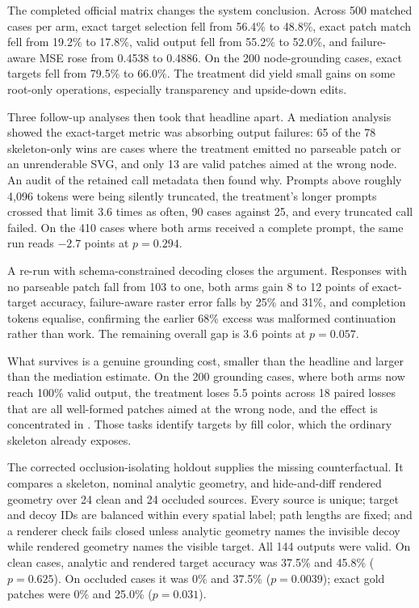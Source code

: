 \documentclass[10pt,a4paper]{article}
\newcommand{\code}[1]{\texttt{\detokenize{#1}}}
\begin{document}
The completed official matrix changes the system conclusion. Across 500
matched cases per arm, exact target selection fell from 56.4\% to 48.8\%,
exact patch match fell from 19.2\% to 17.8\%, valid output fell from 55.2\% to
52.0\%, and failure-aware MSE rose from 0.4538 to 0.4886. On the 200
node-grounding cases, exact targets fell from 79.5\% to 66.0\%. The treatment
did yield small gains on some root-only operations, especially transparency and
upside-down edits.

Three follow-up analyses then took that headline apart. A mediation analysis
showed the exact-target metric was absorbing output failures: 65 of the 78
skeleton-only wins are cases where the treatment emitted no parseable patch or
an unrenderable SVG, and only 13 are valid patches aimed at the wrong node. An
audit of the retained call metadata then found why. Prompts above roughly
4,096 tokens were being silently truncated, the treatment's longer prompts
crossed that limit 3.6 times as often, 90 cases against 25, and every
truncated call failed. On the 410 cases where both arms received a complete
prompt, the same run reads \(-2.7\) points at \(p=0.294\).

A re-run with schema-constrained decoding closes the argument. Responses with
no parseable patch fall from 103 to one, both arms gain 8 to 12 points of
exact-target accuracy, failure-aware raster error falls by 25\% and 31\%,
and completion tokens equalise, confirming the earlier 68\% excess was
malformed continuation rather than work. The remaining overall gap is 3.6
points at \(p=0.057\).

What survives is a genuine grounding cost, smaller than the headline and
larger than the mediation estimate. On the 200 grounding cases, where both
arms now reach 100\% valid output, the treatment loses 5.5 points across 18
paired losses that are all well-formed patches aimed at the wrong node, and
the effect is concentrated in \code{change_color}. Those tasks identify
targets by fill color, which the ordinary skeleton already exposes.

The corrected occlusion-isolating holdout supplies the missing counterfactual.
It compares a skeleton, nominal analytic geometry, and hide-and-diff rendered
geometry over 24 clean and 24 occluded sources. Every source is unique; target
and decoy IDs are balanced within every spatial label; path lengths are fixed;
and a renderer check fails closed unless analytic geometry names the invisible
decoy while rendered geometry names the visible target. All 144 outputs were
valid. On clean cases, analytic and rendered target accuracy was 37.5\% and
45.8\% (\(p=0.625\)). On occluded cases it was 0\% and 37.5\%
(\(p=0.0039\)); exact gold patches were 0\% and 25.0\% (\(p=0.031\)).
\end{document}
